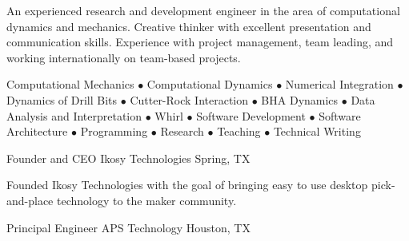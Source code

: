 \documentclass{leresume}
\begin{document}
	\thispagestyle{lefooterhorizontalline}
	\makeresumeheaderC
	
	An experienced research and development engineer in the area of computational dynamics and mechanics. Creative thinker with excellent presentation and communication skills. Experience with project management, team leading, and working internationally on team-based projects.

	Computational Mechanics $\bullet$ Computational Dynamics $\bullet$ Numerical Integration $\bullet$ Dynamics of Drill Bits $\bullet$ Cutter-Rock Interaction $\bullet$ BHA Dynamics $\bullet$ Data Analysis and Interpretation $\bullet$ Whirl $\bullet$ Software Development $\bullet$ Software Architecture $\bullet$ Programming $\bullet$ Research $\bullet$ Teaching $\bullet$ Technical Writing


            {Founder and CEO}
            {Ikosy Technologies}
			{Spring, TX}
			
					\noindent Founded Ikosy Technologies with the goal of bringing easy to use desktop pick-and-place technology to the maker community.\hspace*{0pt}\\ \vspace*{-2pt}
				
            {Principal Engineer}
            {APS Technology}
			{Houston, TX}
			
\end{document}
